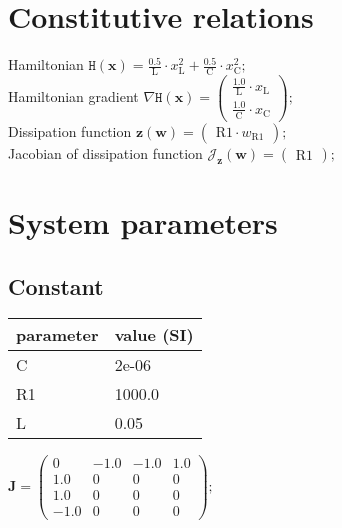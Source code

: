 \documentclass[11pt, oneside]{article}      %
\begin{document}
\section{Constitutive relations}
%
Hamiltonian $ \mathtt{H}(\mathbf{x}) = \frac{0.5}{\mathrm{L}} \cdot x_{\mathrm{L}}^{2} + \frac{0.5}{\mathrm{C}} \cdot x_{\mathrm{C}}^{2} ; $ 
%
\\
%
Hamiltonian gradient $ \nabla \mathtt{H}(\mathbf{x}) = \left(\begin{array}{c}\frac{1.0}{\mathrm{L}} \cdot x_{\mathrm{L}}\\\frac{1.0}{\mathrm{C}} \cdot x_{\mathrm{C}}\end{array}\right) ; $ 
%
\\
%
Dissipation function $ \mathbf{z}(\mathbf{w}) = \left(\begin{array}{c}\mathrm{R1} \cdot w_{\mathrm{R1}}\end{array}\right) ; $ 
%
\\
%
Jacobian of dissipation function $ \mathcal{J}_{\mathbf{z}}(\mathbf{w}) = \left(\begin{array}{c}\mathrm{R1}\end{array}\right) ; $ 
%
\\
%
%
\section{System parameters}
%
%
\subsection{Constant}
%
\begin{center}
%
\begin{tabular}{ll}
%
\hline
parameter & value (SI)
\\ \hline
C & 2e-06
\\
R1 & 1000.0
\\
L & 0.05
\\
\hline
\end{tabular}
%
\end{center}
%
$ \mathbf{J} = \left(\begin{array}{cccc}0 & -1.0 & -1.0 & 1.0\\1.0 & 0 & 0 & 0\\1.0 & 0 & 0 & 0\\-1.0 & 0 & 0 & 0\end{array}\right) ; $ 
%
\\
%
\end{document}
